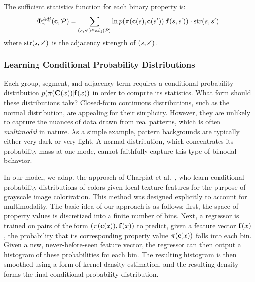 The sufficient statistics function for each binary property is:
 \begin{equation*}
 \Phi^{Adj}_\pi(\mathbf{c}, \mathcal{P}) =
 	\sum_{(s, s^{\prime}) \in \text{adj}(\mathcal{P})}
 		\ln p( \pi( \mathbf{c}(s), \mathbf{c}(s^{\prime}) ) | \mathbf{f}(s, s^{\prime}) ) \cdot \text{str}(s, s^{\prime}) 
 \end{equation*}
 where $\text{str}(s,s^{\prime})$ is the adjacency strength of $(s,s^{\prime})$.~


\subsubsection{Learning Conditional Probability Distributions}
\label{sec:learningPdfs}

Each group, segment, and adjacency term requires a conditional probability distribution $p(\pi(\mathbf{C}(x))|\mathbf{f}(x))$ in order to compute its statistics. What form should these distributions take? Closed-form continuous distributions, such as the normal distribution, are appealing for their simplicity.  However, they are unlikely to capture the nuances of data drawn from real patterns, which is often \emph{multimodal} in nature. As a simple example, pattern backgrounds are typically either very dark or very light. A normal distribution, which concentrates its probability mass at one mode, cannot faithfully capture this type of bimodal behavior.

In our model, we adapt the approach of Charpiat et al.~, who learn conditional probability distributions of colors given local texture features for the purpose of grayscale image colorization. This method was designed explicitly to account for multimodality. The basic idea of our approach is as follows: first, the space of property values is discretized into a finite number of bins. Next, a regressor is trained on pairs of the form $(\pi(\mathbf{c}(x)), \mathbf{f}(x))$ to predict, given a feature vector $\mathbf{f}(x)$, the probability that its corresponding property value $\pi(\mathbf{c}(x))$ falls into each bin. Given a new, never-before-seen feature vector, the regressor can then output a histogram of these probabilities for each bin. The resulting histogram is then smoothed using a form of kernel density estimation, and the resulting density forms the final conditional probability distribution.


